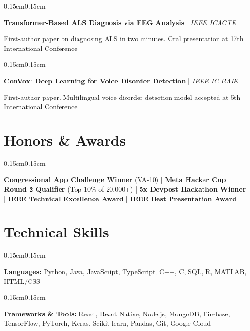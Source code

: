 \documentclass[10pt, letterpaper]{article}
\newenvironment{onecolentry}{
    \begin{adjustwidth}{0.15cm}{0.15cm}
}{
    \end{adjustwidth}
}
\begin{document}
    \vspace{0.1cm}

    \begin{onecolentry}
        \textbf{Transformer-Based ALS Diagnosis via EEG Analysis} | \textit{IEEE ICACTE}
        
        First-author paper on diagnosing ALS in two minutes. Oral presentation at 17th International Conference
    \end{onecolentry}

    \vspace{0.1cm}

    \begin{onecolentry}
        \textbf{ConVox: Deep Learning for Voice Disorder Detection} | \textit{IEEE IC-BAIE}
        
        First-author paper. Multilingual voice disorder detection model accepted at 5th International Conference
    \end{onecolentry}

    \section{Honors \& Awards}

    \begin{onecolentry}
        \textbf{Congressional App Challenge Winner} (VA-10) | \textbf{Meta Hacker Cup Round 2 Qualifier} (Top 10\% of 20,000+) | \textbf{5x Devpost Hackathon Winner} | \textbf{IEEE Technical Excellence Award} | \textbf{IEEE Best Presentation Award}
    \end{onecolentry}

    \section{Technical Skills}

    \begin{onecolentry}
        \textbf{Languages:} Python, Java, JavaScript, TypeScript, C++, C, SQL, R, MATLAB, HTML/CSS
    \end{onecolentry}

    \vspace{0.05cm}

    \begin{onecolentry}
        \textbf{Frameworks \& Tools:} React, React Native, Node.js, MongoDB, Firebase, TensorFlow, PyTorch, Keras, Scikit-learn, Pandas, Git, Google Cloud
    \end{onecolentry}
\end{document}
